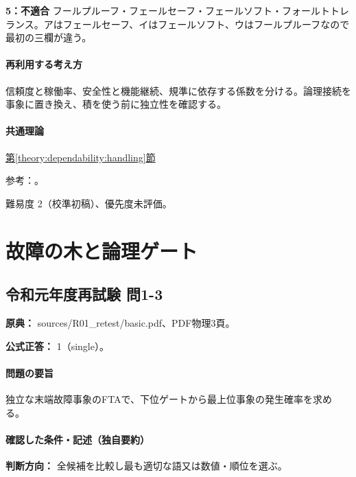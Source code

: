 \noindent\textbf{5：不適合} フールプルーフ・フェールセーフ・フェールソフト・フォールトトレランス。アはフェールセーフ、イはフェールソフト、ウはフールプルーフなので最初の三欄が違う。\par

\paragraph{再利用する考え方} 信頼度と稼働率、安全性と機能継続、規準に依存する係数を分ける。論理接続を事象に置き換え、積を使う前に独立性を確認する。

\paragraph{共通理論} \hyperref[theory:dependability:handling]{第\ref*{theory:dependability:handling}節}

\par 参考：\cite{design_mhlw_foolproof,design_mhlw_failsafe,design_nasa_tolerance}。

\par 難易度 2（校準初稿）、優先度未評価。

\section{故障の木と論理ゲート}

\subsection{令和元年度再試験 問1-3}
\label{q:r01-ret-basic-1-3}

\noindent\textbf{原典：} sources/R01\_retest/basic.pdf、PDF物理3頁。

\textbf{公式正答：} 1（single）。

\paragraph{問題の要旨} 独立な末端故障事象のFTAで、下位ゲートから最上位事象の発生確率を求める。

\paragraph{確認した条件・記述（独自要約）}\mbox{}\par

\noindent\textbf{判断方向：} 全候補を比較し最も適切な語又は数値・順位を選ぶ。\par

